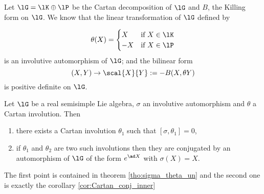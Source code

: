 Let $\lG=\lK\oplus\lP$ be the Cartan decomposition of $\lG$ and $B$, the Killing form on $\lG$. We know that the linear transformation of $\lG$ defined by
 
\[ 
 \theta(X)=\begin{cases}
             X & \text{if $X\in\lK$}\\
	     -X& \text{if $X\in\lP$}
           \end{cases}
\] 
 is an involutive automorphism of $\lG$; and the bilinear form
\[
  (X,Y)\to\scal{X}{Y}:=-B(X,\theta Y)
\]
is positive definite on $\lG$.

\begin{theorem}
Let $\lG$ be a real semisimple Lie algebra, $\sigma$ an involutive automorphism and $\theta$ a Cartan involution. Then

\begin{enumerate}
\item there exists a Cartan involution $\theta_1$ such that $[\sigma,\theta_1]=0$,
\item if $\theta_1$ and $\theta_2$ are two such involutions then they are conjugated by an automorphism of $\lG$ of the form $e^{\ad X}$ with $\sigma(X)=X$.
\end{enumerate}
\label{tho:sigma_theta}
\end{theorem}

The first point is contained in theorem \ref{tho:sigma_theta_un} and the second one is exactly the corollary \ref{cor:Cartan_conj_inner}




